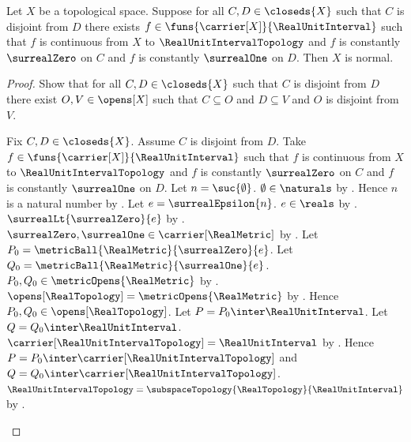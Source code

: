 \begin{theorem}\label{unit_interval_separation_implies_normal}
    Let $X$ be a topological space.
    Suppose for all $C,D\in\closeds{X}$ such that
        $C$ is disjoint from $D$ there exists
        $f\in\funs{\carrier[X]}{\RealUnitInterval}$ such that
        $f$ is continuous from $X$ to $\RealUnitIntervalTopology$ and
        $f$ is constantly $\surrealZero$ on $C$ and
        $f$ is constantly $\surrealOne$ on $D$.
    Then $X$ is normal.
\end{theorem}
\begin{proof}
    Show that for all $C,D\in\closeds{X}$ such that
        $C$ is disjoint from $D$ there exist $O,V\in\opens[X]$ such that
        $C\subseteq O$ and $D\subseteq V$ and
        $O$ is disjoint from $V$.
    \begin{subproof}
        Fix $C,D\in\closeds{X}$.
        Assume $C$ is disjoint from $D$.
        Take $f\in\funs{\carrier[X]}{\RealUnitInterval}$ such that
            $f$ is continuous from $X$ to
            $\RealUnitIntervalTopology$ and
            $f$ is constantly $\surrealZero$ on $C$ and
            $f$ is constantly $\surrealOne$ on $D$.
        Let $n=\suc{\emptyset}$.
        $\emptyset\in\naturals$ by .
        Hence $n$ is a natural number by .
        Let $e=\surrealEpsilon{n}$.
        $e\in\reals$ by .
        $\surrealLt{\surrealZero}{e}$
            by .
        $\surrealZero,\surrealOne\in\carrier[\RealMetric]$
            by
            .
        Let $P_0=\metricBall{\RealMetric}{\surrealZero}{e}$.
        Let $Q_0=\metricBall{\RealMetric}{\surrealOne}{e}$.
        $P_0,Q_0\in\metricOpens{\RealMetric}$
            by .
        $\opens[\RealTopology]=\metricOpens{\RealMetric}$
            by .
        Hence $P_0,Q_0\in\opens[\RealTopology]$.
        Let $P=P_0\inter\RealUnitInterval$.
        Let $Q=Q_0\inter\RealUnitInterval$.
        $\carrier[\RealUnitIntervalTopology]=\RealUnitInterval$
            by .
        Hence
            $P=P_0\inter\carrier[\RealUnitIntervalTopology]$ and
            $Q=Q_0\inter\carrier[\RealUnitIntervalTopology]$.
        $\RealUnitIntervalTopology
            =\subspaceTopology{\RealTopology}{\RealUnitInterval}$
            by .

\end{subproof}
\end{proof}
